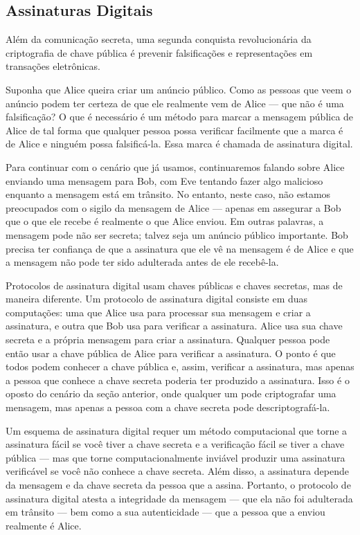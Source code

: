 \documentclass{book}
\begin{document}

\subsection{Assinaturas Digitais}
\label{segredos:ass-digitais}

Além da comunicação secreta, uma segunda conquista revolucionária da criptografia de chave pública é prevenir falsificações e representações em transações eletrônicas.

Suponha que Alice queira criar um anúncio público. Como as pessoas que veem o anúncio podem ter certeza de que ele realmente vem de Alice --- que não é uma falsificação? O que é necessário é um método para marcar a mensagem pública de Alice de tal forma que qualquer pessoa possa verificar facilmente que a marca é de Alice e ninguém possa falsificá-la. Essa marca é chamada de assinatura digital.

Para continuar com o cenário que já usamos, continuaremos falando sobre Alice enviando uma mensagem para Bob, com Eve tentando fazer algo malicioso enquanto a mensagem está em trânsito. No entanto, neste caso, não estamos preocupados com o sigilo da mensagem de Alice --- apenas em assegurar a Bob que o que ele recebe é realmente o que Alice enviou. Em outras palavras, a mensagem pode não ser secreta; talvez seja um anúncio público importante. Bob precisa ter confiança de que a assinatura que ele vê na mensagem é de Alice e que a mensagem não pode ter sido adulterada antes de ele recebê-la.

Protocolos de assinatura digital usam chaves públicas e chaves secretas, mas de maneira diferente. Um protocolo de assinatura digital consiste em duas computações: uma que Alice usa para processar sua mensagem e criar a assinatura, e outra que Bob usa para verificar a assinatura. Alice usa sua chave secreta e a própria mensagem para criar a assinatura. Qualquer pessoa pode então usar a chave pública de Alice para verificar a assinatura. O ponto é que todos podem conhecer a chave pública e, assim, verificar a assinatura, mas apenas a pessoa que conhece a chave secreta poderia ter produzido a assinatura. Isso é o oposto do cenário da seção anterior, onde qualquer um pode criptografar uma mensagem, mas apenas a pessoa com a chave secreta pode descriptografá-la.

Um esquema de assinatura digital requer um método computacional que torne a assinatura fácil se você tiver a chave secreta e a verificação fácil se tiver a chave pública --- mas que torne computacionalmente inviável produzir uma assinatura verificável se você não conhece a chave secreta. Além disso, a assinatura depende da mensagem e da chave secreta da pessoa que a assina. Portanto, o protocolo de assinatura digital atesta a integridade da mensagem --- que ela não foi adulterada em trânsito --- bem como a sua autenticidade --- que a pessoa que a enviou realmente é Alice.
\end{document}
